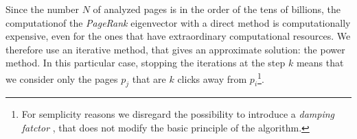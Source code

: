 Since the number $N$ of analyzed pages is in the order of the tens of billions,
the computationof the \emph{PageRank} eigenvector with a direct method is
computationally expensive, even for the ones that have extraordinary
computational resources. We therefore use an iterative method, that gives an
approximate solution: the power method. In this particular case, stopping the
iterations at the step $k$ means that we consider only the pages $p_j$ that
are $k$ clicks away from $p_i$\footnote{For semplicity reasons we disregard the
possibility to introduce a \emph{damping fatctor} \cite{Brin1998}, that does
not modify the basic principle of the algorithm.}.
